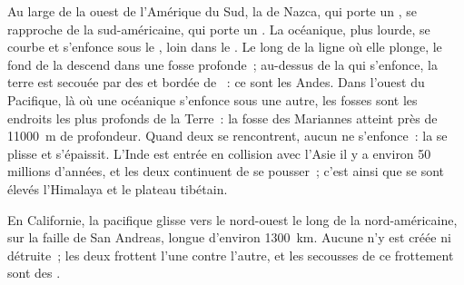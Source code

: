 \begin{example}\label{ex:g7:plate-tectonics:convergent}
Au large de la  ouest de l'Amérique du Sud, la  de Nazca, qui
porte un , se rapproche de la  sud-américaine, qui porte un
. La  océanique, plus lourde, se courbe et s'enfonce sous le
, loin dans le . Le long de la ligne où elle plonge, le
fond de la  descend dans une fosse profonde~; au-dessus de la  qui
s'enfonce, la terre est secouée par des  et bordée de ~: ce
sont les Andes. Dans l'ouest du Pacifique, là où une  océanique
s'enfonce sous une autre, les fosses sont les endroits les plus profonds
de la Terre~: la fosse des Mariannes atteint près de \qty{11000}{m} de
profondeur. Quand deux  se rencontrent, aucun ne s'enfonce~: la
 se plisse et s'épaissit. L'Inde est entrée en collision avec l'Asie
il y a environ 50 millions d'années, et les deux  continuent de se
pousser~; c'est ainsi que se sont élevés l'Himalaya et le plateau tibétain.
\end{example}

\begin{example}\label{ex:g7:plate-tectonics:transform}
En Californie, la  pacifique glisse vers le nord-ouest le long de la
 nord-américaine, sur la faille de San Andreas, longue d'environ
\qty{1300}{km}. Aucune  n'y est créée ni détruite~; les deux 
frottent l'une contre l'autre, et les secousses de ce frottement sont des
.
\end{example}

